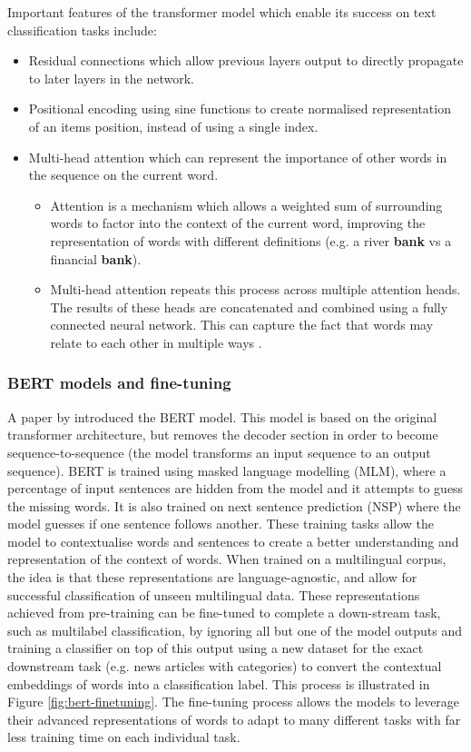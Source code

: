 \documentclass{l4proj}
\begin{document}
Important features of the transformer model which enable its success on text classification tasks include:
\begin{itemize}
    \item Residual connections which allow previous layers output to directly propagate to later layers in the network.
    \item Positional encoding using sine functions to create normalised representation of an items position, instead of using a single index.
    \item Multi-head attention which can represent the importance of other words in the sequence on the current word. 
    \begin{itemize}
        \item Attention is a mechanism which allows a weighted sum of surrounding words to factor into the context of the current word, improving the representation of words with different definitions (e.g. a river \textbf{bank} vs a financial \textbf{bank}).
        \item Multi-head attention repeats this process across multiple attention heads. The results of these heads are concatenated and combined using a fully connected neural network. This can capture the fact that words may relate to each other in multiple ways \citep{vaswani2017attention}.
    \end{itemize}
\end{itemize}

\subsubsection{BERT models and fine-tuning} \hfill \par
A paper by \cite{devlin2018bert} introduced the BERT model. This model is based on the original transformer architecture, but removes the decoder section in order to become sequence-to-sequence (the model transforms an input sequence to an output sequence). BERT is trained using masked language modelling (MLM), where a percentage of input sentences are hidden from the model and it attempts to guess the missing words. It is also trained on next sentence prediction (NSP) where the model guesses if one sentence follows another. These training tasks allow the model to contextualise words and sentences to create a better understanding and representation of the context of words. When trained on a multilingual corpus, the idea is that these representations are language-agnostic, and allow for successful classification of unseen multilingual data. These representations achieved from pre-training can be fine-tuned to complete a down-stream task, such as multilabel classification, by ignoring all but one of the model outputs and training a classifier on top of this output using a new dataset for the exact downstream task (e.g. news articles with categories) to convert the contextual embeddings of words into a classification label. This process is illustrated in Figure \ref{fig:bert-finetuning}. The fine-tuning process allows the models to leverage their advanced representations of words to adapt to many different tasks with far less training time on each individual task.
\end{document}
